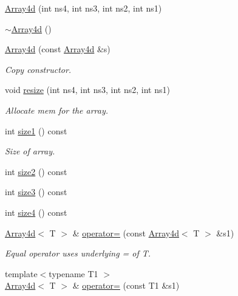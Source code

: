 \begin{DoxyCompactItemize}
\item 
\mbox{\hyperlink{classXMLArray_1_1Array4d_a409005374380cbfb8553f3237db7990b}{Array4d}} (int ns4, int ns3, int ns2, int ns1)
\item 
\mbox{\hyperlink{classXMLArray_1_1Array4d_a80523fcfbd3cf8493a2f5928dd9a3f15}{$\sim$\+Array4d}} ()
\item 
\mbox{\hyperlink{classXMLArray_1_1Array4d_aa288af6ef6ecbd04554a984ce1514c01}{Array4d}} (const \mbox{\hyperlink{classXMLArray_1_1Array4d}{Array4d}} \&s)
\begin{DoxyCompactList}\small\item\em Copy constructor. \end{DoxyCompactList}\item 
void \mbox{\hyperlink{classXMLArray_1_1Array4d_a8726b8005ecb501662b5e76873702480}{resize}} (int ns4, int ns3, int ns2, int ns1)
\begin{DoxyCompactList}\small\item\em Allocate mem for the array. \end{DoxyCompactList}\item 
int \mbox{\hyperlink{classXMLArray_1_1Array4d_a27899b6dccfd5d85d299da80da9a4c14}{size1}} () const
\begin{DoxyCompactList}\small\item\em Size of array. \end{DoxyCompactList}\item 
int \mbox{\hyperlink{classXMLArray_1_1Array4d_a18c3f8237c652b642c5de6df15764c34}{size2}} () const
\item 
int \mbox{\hyperlink{classXMLArray_1_1Array4d_ae9c6211389f5a1fd2bc756bb5e7b53b1}{size3}} () const
\item 
int \mbox{\hyperlink{classXMLArray_1_1Array4d_abcaa3187b7b1b4b36997937c7597f393}{size4}} () const
\item 
\mbox{\hyperlink{classXMLArray_1_1Array4d}{Array4d}}$<$ T $>$ \& \mbox{\hyperlink{classXMLArray_1_1Array4d_a3231647c370f838502526de102af1b23}{operator=}} (const \mbox{\hyperlink{classXMLArray_1_1Array4d}{Array4d}}$<$ T $>$ \&s1)
\begin{DoxyCompactList}\small\item\em Equal operator uses underlying = of T. \end{DoxyCompactList}\item 
{\footnotesize template$<$typename T1 $>$ }\\\mbox{\hyperlink{classXMLArray_1_1Array4d}{Array4d}}$<$ T $>$ \& \mbox{\hyperlink{classXMLArray_1_1Array4d_a15b8c36a1edd1f72a12301798e0810b5}{operator=}} (const T1 \&s1)

\end{DoxyCompactItemize}
